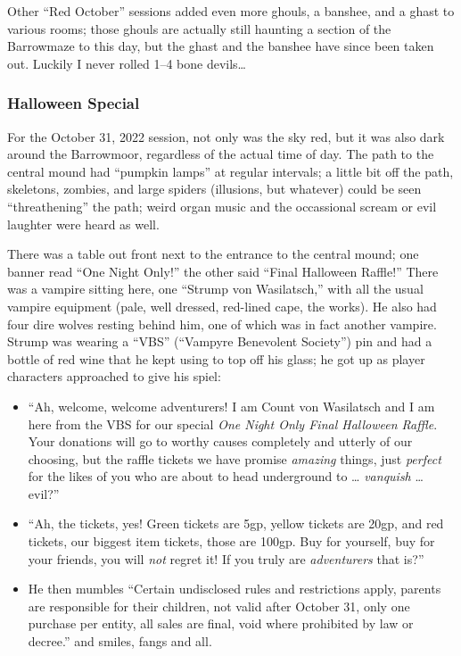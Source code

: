 Other ``Red October'' sessions added even more ghouls, a banshee, and a ghast
to various rooms; those ghouls are actually still haunting a section of the
Barrowmaze to this day, but the ghast and the banshee have since been taken out.
Luckily I never rolled 1--4 bone devils\dots{}

\subsubsection{Halloween Special}

For the October 31, 2022 session, not only was the sky red, but it was also
dark around the Barrowmoor, regardless of the actual time of day. The path to
the central mound had ``pumpkin lamps'' at regular intervals; a little bit off
the path, skeletons, zombies, and large spiders (illusions, but whatever) could
be seen ``threathening'' the path; weird organ music and the occassional scream
or evil laughter were heard as well.

There was a table out front next to the entrance to the central mound; one banner
read ``One Night Only!'' the other said ``Final Halloween Raffle!'' There was a
vampire sitting here, one ``Strump von Wasilatsch,'' with all the usual vampire
equipment (pale, well dressed, red-lined cape, the works). He also had four dire
wolves resting behind him, one of which was in fact another vampire. Strump was
wearing a ``VBS'' (``Vampyre Benevolent Society'') pin and had a bottle of red
wine that he kept using to top off his glass; he got up as player characters
approached to give his spiel:

\begin{itemize}

\item ``Ah, welcome, welcome adventurers! I am Count von Wasilatsch and I am
  here from the VBS for our special \emph{One Night Only Final Halloween Raffle}.
  Your donations will go to worthy causes completely and utterly of our choosing,
  but the raffle tickets we have promise \emph{amazing} things, just \emph{perfect}
  for the likes of you who are about to head underground to \dots{} \emph{vanquish}
  \dots{} evil?''

\item ``Ah, the tickets, yes! Green tickets are 5gp, yellow tickets are 20gp,
  and red tickets, our biggest item tickets, those are 100gp. Buy for yourself,
  buy for your friends, you will \emph{not} regret it! If you truly are
  \emph{adventurers} that is?''

\item He then mumbles ``Certain undisclosed rules and restrictions apply,
  parents are responsible for their children, not valid after October 31, only
  one purchase per entity, all sales are final, void where prohibited by law or
  decree.'' and smiles, fangs and all.

\end{itemize}

